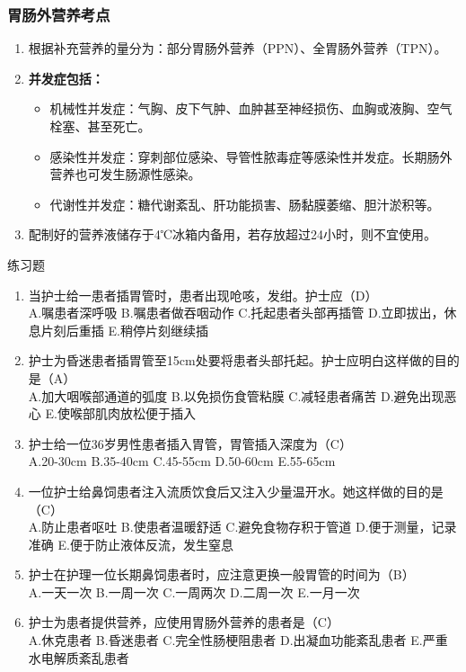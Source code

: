 \documentclass[11pt, a4paper]{ctexart}
\begin{document}
\subsubsection{胃肠外营养考点}
\begin{enumerate}
    \item 根据补充营养的量分为：部分胃肠外营养（PPN）、全胃肠外营养（TPN）。
    \item \textbf{并发症包括：}
    \begin{itemize}
        \item 机械性并发症：气胸、皮下气肿、血肿甚至神经损伤、血胸或液胸、空气栓塞、甚至死亡。
        \item 感染性并发症：穿刺部位感染、导管性脓毒症等感染性并发症。长期肠外营养也可发生肠源性感染。
        \item 代谢性并发症：糖代谢紊乱、肝功能损害、肠黏膜萎缩、胆汁淤积等。
    \end{itemize}
    \item 配制好的营养液储存于4℃冰箱内备用，若存放超过24小时，则不宜使用。
\end{enumerate}

\begin{examplebox}{练习题}
\begin{enumerate}
    \item 当护士给一患者插胃管时，患者出现呛咳，发绀。护士应（D）\\
    A.嘱患者深呼吸 \quad B.嘱患者做吞咽动作 \quad C.托起患者头部再插管 \quad D.立即拔出，休息片刻后重插 \quad E.稍停片刻继续插
    \item 护士为昏迷患者插胃管至15cm处要将患者头部托起。护士应明白这样做的目的是（A）\\
    A.加大咽喉部通道的弧度 \quad B.以免损伤食管粘膜 \quad C.减轻患者痛苦 \quad D.避免出现恶心 \quad E.使喉部肌肉放松便于插入
    \item 护士给一位36岁男性患者插入胃管，胃管插入深度为（C）\\
    A.20-30cm \quad B.35-40cm \quad C.45-55cm \quad D.50-60cm \quad E.55-65cm
    \item 一位护士给鼻饲患者注入流质饮食后又注入少量温开水。她这样做的目的是（C）\\
    A.防止患者呕吐 \quad B.使患者温暖舒适 \quad C.避免食物存积于管道 \quad D.便于测量，记录准确 \quad E.便于防止液体反流，发生窒息
    \item 护士在护理一位长期鼻饲患者时，应注意更换一般胃管的时间为（B）\\
    A.一天一次 \quad B.一周一次 \quad C.一周两次 \quad D.二周一次 \quad E.一月一次
    \item 护士为患者提供营养，应使用胃肠外营养的患者是（C）\\
    A.休克患者 \quad B.昏迷患者 \quad C.完全性肠梗阻患者 \quad D.出凝血功能紊乱患者 \quad E.严重水电解质紊乱患者
\end{enumerate}
\end{examplebox}
\end{document}
